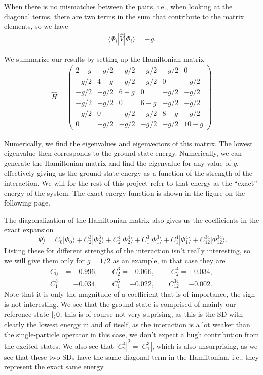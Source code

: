 \documentclass[a4paper, 11pt, notitlepage, english]{article}
\newcommand{\ket}[1]{|#1 \rangle}
\newcommand{\op}[1]{\hat{#1}}
\newcommand{\braopket}[3]{\langle #1 | {#2} | #3 \rangle}
\begin{document}
When there is no mismatches between the pairs, i.e., when looking at the diagonal terms,  there are two terms in the sum that contribute to the matrix elements, so we have
\begin{align*}
\braopket{\Phi_i}{\op{V}}{\Phi_i} = -g.
\end{align*}

We summarize our results by setting up the Hamiltonian matrix
\begin{align*}
\op{H} = \begin{pmatrix}
2 - g &  -g/2 & -g/2  & -g/2  & -g/2  & 0     \\
-g/2  & 4 - g & -g/2  & -g/2  & 0     & -g/2  \\
-g/2  & -g/2  & 6 - g &	0     & -g/2  & -g/2  \\              
-g/2  & -g/2  & 0     & 6 - g &	-g/2  & -g/2  \\                         
-g/2  &	0	  & -g/2  & -g/2  & 8 - g & -g/2  \\
0     &  -g/2 & -g/2  & -g/2  &  -g/2 & 10 - g 
\end{pmatrix}
\end{align*}

Numerically, we find the eigenvalues and eigenvectors of this matrix. The lowest eigenvalue then corresponds to the ground state energy. Numerically, we can generate the Hamiltonian matrix and find the eigenvalue for any value of $g$, effectively giving us the ground state energy as a function of the strength of the interaction. We will for the rest of this project refer to that energy as the ``exact'' energy of the system. The exact energy function is shown in the figure on the following page.

The diagonalization of the Hamiltonian matrix also gives us the coefficients in the exact expansion
$$\ket{\Psi} = C_0\ket{\Phi_0} + C_{2}^{3} \ket{\Phi_{2}^{3}} +  C_{2}^{4} \ket{\Phi_{2}^{4}} +  C_{1}^{3} \ket{\Phi_{1}^{3}} +  C_{1}^{4} \ket{\Phi_{1}^{4}} + C_{12}^{34} \ket{\Phi_{12}^{34}}.$$
Listing these for different strengths of the interaction isn't really interesting, so we will give them only for $g=1/2$ as an example, in that case they are
\begin{align*}
C_0 &= -0.996, \qquad C_2^3 = -0.066, \,\, \qquad C_2^4 = -0.034, \\
C_1^3 &= -0.034, \qquad   C_1^5 = -0.022, \qquad C_{12}^{34} = -0.002.
\end{align*}
Note that it is only the magnitude of a coefficient that is of importance, the sign is not interesting. We see that the ground state is comprised of mainly our reference state $\ket_{0}$, this is of course not very suprising, as this is the SD with clearly the lowest energy in and of itself, as the interaction is a lot weaker than the single-particle operator in this case, we don't expect a hugh contribution from the excited states. We also see that $|C_2^4|^2 = |C_1^3|$, which is also unsurprising, as we see that these two SDs have the same diagonal term in the Hamiltonian, i.e., they represent the exact same energy.
\end{document}
